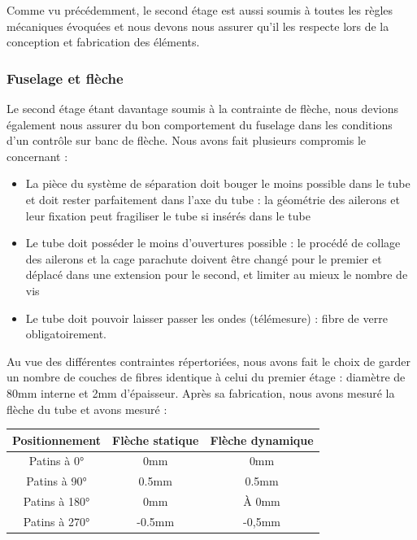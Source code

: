 Comme vu précédemment, le second étage est aussi soumis à toutes les règles mécaniques évoquées et nous devons nous 
assurer qu'il les respecte lors de la conception et fabrication des éléments.



\subsubsection{Fuselage et flèche}
\label{subsubsec:second_etage}
Le second étage étant davantage soumis à la contrainte de flèche, nous devions également nous assurer du bon comportement 
du fuselage dans les conditions d'un contrôle sur banc de flèche.
Nous avons fait  plusieurs compromis le concernant :
\begin{itemize}
    \item La pièce du système de séparation doit bouger le moins possible dans le tube et doit rester parfaitement dans 
    l'axe du tube : la géométrie des ailerons et leur fixation peut fragiliser le tube si insérés dans le tube
    \item Le tube doit posséder le moins d'ouvertures possible : le procédé de collage des ailerons et la cage parachute 
    doivent être changé pour le premier et déplacé dans une extension pour le second, et limiter au mieux le nombre de vis
    \item Le tube doit pouvoir laisser passer les ondes (télémesure) : fibre de verre obligatoirement.
\end{itemize}

Au vue des différentes contraintes répertoriées, nous avons fait le choix de garder un nombre de couches de fibres 
identique à celui du premier étage : diamètre de 80mm interne et 2mm d'épaisseur. Après sa fabrication, nous avons mesuré 
la flèche du tube et avons mesuré :

\begin{table}[h!]
\centering
\begin{tabular}{|c|c|c|}
\hline
Positionnement & Flèche statique & Flèche dynamique \\ \hline
Patins à 0° & 0mm & 0mm \\ \hline
Patins à 90° & 0.5mm & 0.5mm \\ \hline
Patins à 180° & 0mm & À 0mm \\ \hline
Patins à 270° & -0.5mm & -0,5mm \\ \hline
\end{tabular}
\end{table}

